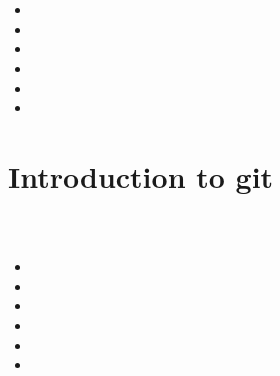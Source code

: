 \documentclass[12pt,ngerman]{beamer}
\begin{document}
\begin{frame}
\frametitle{}
\framesubtitle{~}

\begin{itemize}
\item 
\item 
\item 
\item 
\item 
\item 
\end{itemize}
\end{frame}

\section{Introduction to git}

\begin{frame}
\frametitle{}
\framesubtitle{~}

\begin{itemize}
\item 
\item 
\item 
\item 
\item 
\item 
\end{itemize}
\end{frame}
\end{document}
